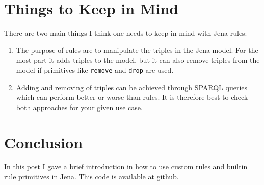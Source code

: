 \documentclass{amsart}
\begin{document}
\section{Things to Keep in Mind}
There are two main things I think one needs to keep in mind with Jena rules:
\begin{enumerate}
 \item The purpose of rules are to manipulate the triples in the Jena model. For the most part it adds triples to the model, but it can also remove triples from the model if primitives like \texttt{remove} and \texttt{drop} are used. 
 \item Adding and removing of triples can be achieved through SPARQL queries which can perform better or worse than rules. It is therefore best to check both approaches for your given use case.
\end{enumerate}

\section{Conclusion}
In this post I gave a brief introduction in how to use custom rules and builtin rule primitives in Jena.
This code is available at \href{http:}{github}.
  
  
 
\end{document}
